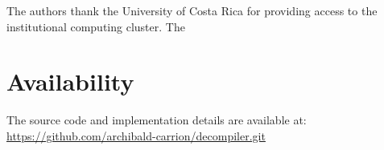 \documentclass[conference]{IEEEtran} %
\begin{document}
The authors thank the University of Costa Rica for providing access to the institutional computing cluster. The %

\section{Availability}

The source code and implementation details are available at: \\
\url{https://github.com/archibald-carrion/decompiler.git}

\printbibliography[title={References}]
\end{document}
